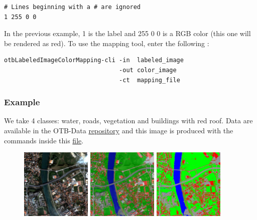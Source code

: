 \begin{verbatim}
# Lines beginning with a # are ignored
1 255 0 0
\end{verbatim}

In the previous example, 1 is the label and 255 0 0 is a RGB color (this one will be rendered as red). To use the mapping tool, enter the following :

\begin{verbatim}
otbLabeledImageColorMapping-cli -in  labeled_image 
                                -out color_image
                                -ct  mapping_file
\end{verbatim}

\subsubsection{Example}
We take 4 classes: water, roads, vegetation and buildings with red roof.
Data are available in the OTB-Data \href{http://hg.orfeo-toolbox.org/OTB-Data/file/0fed8f4f035c/Input/Classification}{repository} and this image is produced with the commands inside this \href{http://hg.orfeo-toolbox.org/OTB-Applications/file/3ce975605013/Testing/Classification/CMakeLists.txt}{file}. 

\begin{figure}[!h]
  \center
  \includegraphics[width=0.3\textwidth]{../Art/MonteverdiImages/classification_chain_inputimage.jpg}
  \includegraphics[width=0.3\textwidth]{../Art/MonteverdiImages/classification_chain_fancyclassif_fusion.jpg}
  \includegraphics[width=0.3\textwidth]{../Art/MonteverdiImages/classification_chain_fancyclassif.jpg}
  \label{fig:MeanShiftVectorImageFilter}
\end{figure}




